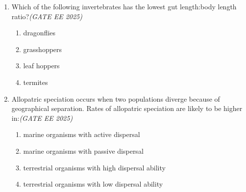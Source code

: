 \begin{enumerate}[leftmargin=*,label=\textbf{Q.\arabic*}]
\item Which of the following invertebrates has the lowest gut length:body length ratio?\hfill \textit{(GATE EE 2025)}
\begin{multicols}{2}
\begin{enumerate}[label=(\Alph*)]
\item dragonflies
\item grasshoppers
\item leaf hoppers
\item termites
\end{enumerate}
\end{multicols}

\item Allopatric speciation occurs when two populations diverge because of geographical separation. Rates of allopatric speciation are likely to be higher in:\hfill \textit{(GATE EE 2025)}

\begin{enumerate}[label=(\Alph*)]
\item marine organisms with active dispersal
\item marine organisms with passive dispersal
\item terrestrial organisms with high dispersal ability
\item terrestrial organisms with low dispersal ability
\end{enumerate}

\end{enumerate}
